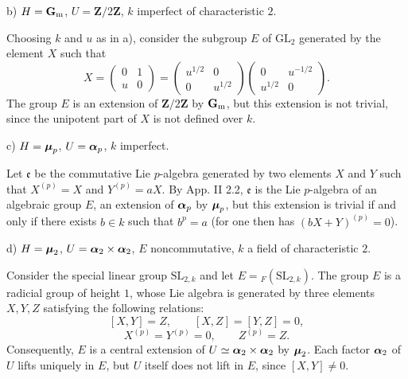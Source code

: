 \noindent b) $H=\mathbf{G}_{\mathrm{m}}$, $U=\mathbf Z/2\mathbf Z$, $k$ imperfect of characteristic $2$.

Choosing $k$ and $u$ as in a), consider the subgroup $E$ of $\mathrm{GL}_2$ generated by the element $X$ such that
\[
X=\begin{pmatrix}0&1\\u&0\end{pmatrix}
=\begin{pmatrix}u^{1/2}&0\\0&u^{1/2}\end{pmatrix}
\begin{pmatrix}0&u^{-1/2}\\u^{1/2}&0\end{pmatrix}.
\]
The group $E$ is an extension of $\mathbf Z/2\mathbf Z$ by $\mathbf{G}_{\mathrm{m}}$, but this extension is not trivial, since the unipotent part of $X$ is not defined over $k$.

\noindent c) $H=\boldsymbol{\mu}_p$, $U=\boldsymbol{\alpha}_p$, $k$ imperfect.

Let $\mathfrak e$ be the commutative Lie $p$-algebra generated by two elements $X$ and $Y$ such that $X^{(p)}=X$ and $Y^{(p)}=aX$. By App. II 2.2, $\mathfrak e$ is the Lie $p$-algebra of an algebraic group $E$, an extension of $\boldsymbol{\alpha}_p$ by $\boldsymbol{\mu}_p$, but this extension is trivial if and only if there exists $b\in k$ such that $b^p=a$ (for one then has $(bX+Y)^{(p)}=0$).

\noindent d) $H=\boldsymbol{\mu}_2$, $U=\boldsymbol{\alpha}_2\times\boldsymbol{\alpha}_2$, $E$ noncommutative, $k$ a field of characteristic $2$.

Consider the special linear group $\mathrm{SL}_{2,k}$ and let $E={}_{F}(\mathrm{SL}_{2,k})$. The group $E$ is a radicial group of height $1$, whose Lie algebra is generated by three elements $X,Y,Z$ satisfying the following relations:
\[
[X,Y]=Z,\qquad[X,Z]=[Y,Z]=0,
\]
\[
X^{(p)}=Y^{(p)}=0,\qquad Z^{(p)}=Z.
\]
Consequently, $E$ is a central extension of $U\simeq\boldsymbol{\alpha}_2\times\boldsymbol{\alpha}_2$ by $\boldsymbol{\mu}_2$. Each factor $\boldsymbol{\alpha}_2$ of $U$ lifts uniquely in $E$, but $U$ itself does not lift in $E$, since $[X,Y]\ne0$.

